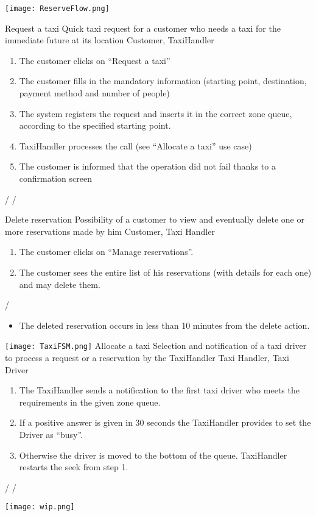 \texttt{[image: ReserveFlow.png]}

\usecase
{Request a taxi}
{Quick taxi request for a customer who needs a taxi for the immediate future at its location}
{Customer, TaxiHandler}
{
\begin{enumerate}
	\item The customer clicks on ``Request a taxi''
	\item The customer fills in the mandatory information (starting point, destination, payment method and number of people)
	\item The system registers the request and inserts it in the correct zone queue, according to the specified starting point.
	\item TaxiHandler processes the call (see ``Allocate a taxi'' use case)
	\item The customer is informed that the operation did not fail thanks to a confirmation screen
\end{enumerate}
}
{
/
}
{ 
/
}

\pagebreak
{}

\usecase
{Delete reservation}
{Possibility of a customer to view and eventually delete one or more reservations made by him}
{Customer, Taxi Handler}
{
\begin{enumerate}
	\item The customer clicks on ``Manage reservations''.
	\item The customer sees the entire list of his reservations (with details for each one) and may delete them.
\end{enumerate}
}
{
/
}
{ 
\begin{itemize}
	\item The deleted reservation occurs in less than 10 minutes from the delete action.
\end{itemize}
}

\pagebreak
{}
\texttt{[image: TaxiFSM.png]}
\pagebreak
\usecase
{Allocate a taxi}
{Selection and notification of a taxi driver to process a request or a reservation by the TaxiHandler}
{Taxi Handler, Taxi Driver}
{
\begin{enumerate}
	\item The TaxiHandler sends a notification to the first taxi driver who meets the requirements in the given zone queue.
	\item If a positive answer is given in 30 seconds the TaxiHandler provides to set the Driver as ``busy''.
	\item Otherwise the driver is moved to the bottom of the queue. TaxiHandler restarts the seek from step 1.
\end{enumerate}
}
{
/
}
{ 
/
}

\pagebreak
{}

\pagebreak
\texttt{[image: wip.png]}

